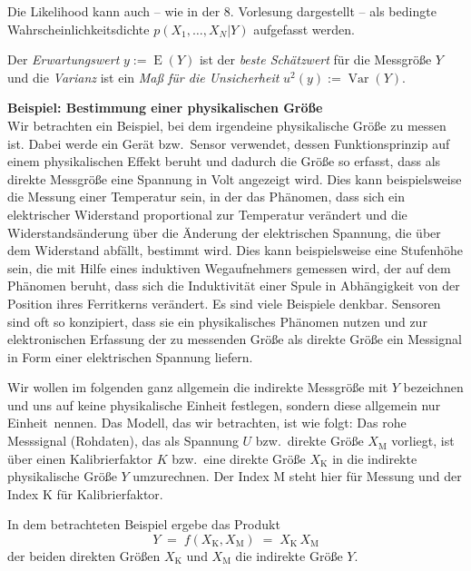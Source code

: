 Die Likelihood kann auch -- wie in der 8. Vorlesung dargestellt -- als bedingte Wahrscheinlichkeitsdichte $p(X_1,\ldots,X_N|Y)$ aufgefasst werden.

Der \textsl{Erwartungswert} $y := \operatorname{E}(Y)$ ist der \textsl{beste Schätzwert} für die Messgröße $Y$ und die \textsl{Varianz} ist ein
\textsl{Maß für die Unsicherheit} $u^2(y) := \operatorname{Var}(Y)$.

\textbf{Beispiel: Bestimmung einer physikalischen Größe}\\
Wir betrachten ein Beispiel, bei dem irgendeine physikalische Größe zu messen ist.
Dabei werde ein Gerät bzw.\ Sensor verwendet, dessen Funktionsprinzip auf einem
physikalischen Effekt beruht und dadurch die Größe so erfasst,
dass als direkte Messgröße eine Spannung in Volt angezeigt wird. Dies kann beispielsweise
die Messung einer Temperatur sein, in der das Phänomen, dass sich ein elektrischer
Widerstand proportional zur Temperatur verändert und die Widerstandsänderung über die
Änderung der elektrischen Spannung, die über dem Widerstand abfällt, bestimmt wird.
Dies kann beispielsweise eine Stufenhöhe sein, die mit Hilfe eines induktiven Wegaufnehmers
gemessen wird, der auf dem Phänomen beruht, dass sich die Induktivität einer Spule in Abhängigkeit
von der  Position ihres Ferritkerns verändert. Es sind viele Beispiele denkbar. Sensoren
sind oft so konzipiert, dass sie ein physikalisches Phänomen nutzen und zur elektronischen
Erfassung der zu messenden Größe als direkte Größe ein Messignal in Form einer elektrischen
Spannung liefern.

Wir wollen im folgenden ganz allgemein die indirekte Messgröße mit $Y$
bezeichnen und uns auf keine physikalische Einheit festlegen, sondern diese allgemein nur
\glqq Einheit\grqq ~nennen. Das Modell, das wir betrachten, ist wie folgt: Das rohe Messsignal (Rohdaten),
das als Spannung $U$ bzw.\ direkte Größe $X_\mathrm{M}$ vorliegt, ist über
einen Kalibrierfaktor $K$ bzw.\ eine direkte Größe $X_\mathrm{K}$
in die indirekte physikalische Größe $Y$ umzurechnen.
Der Index M steht hier für Messung und der Index K für Kalibrierfaktor.

In dem betrachteten Beispiel
ergebe das Produkt
\begin{equation}
Y \; = \; f(X_\mathrm{K}, X_\mathrm{M})  \; = \; X_\mathrm{K} \, X_\mathrm{M}
\end{equation}
der beiden direkten Größen $X_\mathrm{K}$ und $X_\mathrm{M}$ die indirekte Größe $Y$.

